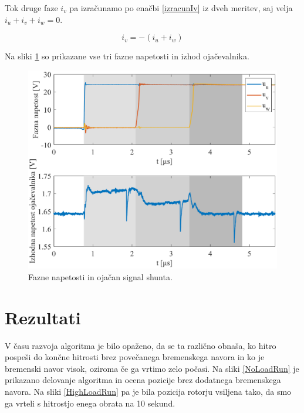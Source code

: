 \documentclass[a4paper,twoside,openright,12pt,slovene]{book}
\begin{document}
Tok druge faze $i_v$ pa izračunamo po enačbi \ref{izracunIv} iz dveh meritev, saj velja $i_u + i_v + i_w = 0$.

\begin{equation} \label{izracunIv}
i_v = -(i_u + i_w)
\end{equation}

Na sliki \ref{fazeInShunt} so prikazane vse tri fazne napetosti in izhod ojačevalnika.

\begin{figure}[!htbp]
    \centering
    \includegraphics[width=0.75\columnwidth]{Slike/fazeInShunt.eps}
    \caption{\label{fazeInShunt} Fazne napetosti in ojačan signal shunta. }
\end{figure}


\section{Rezultati} \label{rezultati}

V času razvoja algoritma je bilo opaženo, da se ta različno obnaša, ko hitro pospeši do končne hitrosti brez povečanega bremenskega navora in ko je bremenski navor visok, oziroma če ga vrtimo zelo
počasi. Na sliki \ref{NoLoadRun} je prikazano delovanje algoritma in ocena pozicije brez dodatnega bremenskega navora. Na sliki \ref{HighLoadRun} pa je bila pozicija rotorju vsiljena tako, da smo ga
vrteli s hitrostjo enega obrata na 10 sekund.
\end{document}
